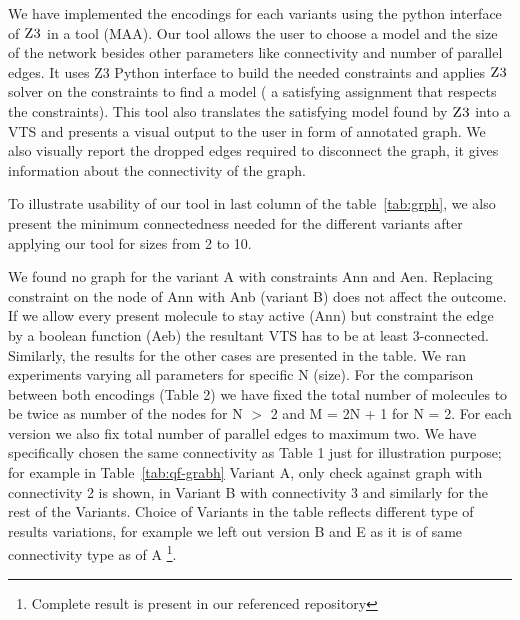%

We have implemented the encodings for each variants
using the python interface of $\textsc{Z3}$ in a tool (MAA).
%
Our tool allows the user to choose a model and the size of the network
besides other parameters like connectivity and number of parallel
edges.
%
It uses Z3 Python interface to build the needed constraints and
applies $\textsc{Z3}$ solver on the constraints to find a model (
a satisfying assignment that respects the constraints).
%
This tool also translates the satisfying model found by $\textsc{Z3}$ into
a VTS and presents a visual output to the user in form of annotated graph.
%
%
%
We also visually report the dropped edges required to disconnect the graph, it gives information about the connectivity of the graph.


To illustrate usability of our tool in last column of the table~\ref{tab:grph}, we also present the minimum connectedness needed for the different variants after applying our tool for sizes from 2 to 10. 

%
We found no graph for the variant A with constraints Ann and Aen.
%
Replacing constraint on the node of Ann with Anb (variant B) does not affect the outcome.
%
If we allow every present molecule to stay active (Ann) but constraint the edge
by a boolean function (Aeb) the resultant VTS has to be at least 3-connected. Similarly, the results for the other cases are presented in the table. 
%
%
We ran experiments varying all parameters for specific N (size). For the comparison between both encodings (Table 2) we have fixed the total number of molecules to be twice as number of the nodes for N $>$ 2 and M = 2N + 1 for N = 2. For each version we also fix total number of parallel edges to maximum two. We have specifically chosen the same connectivity as Table 1 just for illustration purpose; for example in Table~\ref{tab:qf-grabh} Variant A, only check against graph with connectivity 2 is shown, in Variant B with connectivity 3 and similarly for the rest of the Variants. Choice of Variants in the table reflects different type of results variations, for example we left out version B and E as it is of same connectivity type as of A \footnote{Complete result is present in our referenced repository}. 

